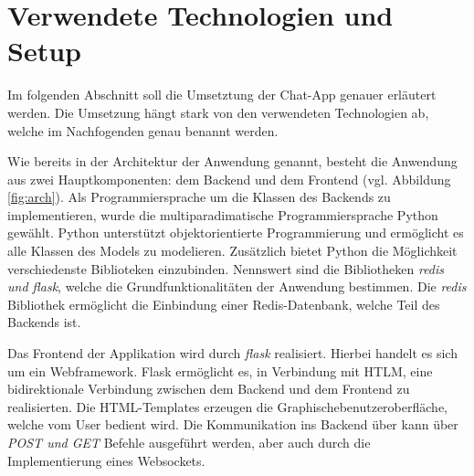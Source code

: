 
\section{Verwendete Technologien und Setup}
Im folgenden Abschnitt soll die Umsetztung der Chat-App genauer erläutert werden.
Die Umsetzung hängt stark von den verwendeten Technologien ab, welche im Nachfogenden genau benannt werden.

Wie bereits in der Architektur der Anwendung genannt, besteht die Anwendung aus zwei Hauptkomponenten: dem Backend und dem Frontend (vgl. Abbildung \ref{fig:arch}).
Als Programmiersprache um die Klassen des Backends zu implementieren, wurde die multiparadimatische Programmiersprache Python gewählt.
Python unterstützt objektorientierte Programmierung und ermöglicht es alle Klassen des Models zu modelieren. 
Zusätzlich bietet Python die Möglichkeit verschiedenste Biblioteken einzubinden.
Nennswert sind die Bibliotheken \textit{redis und flask}, welche die Grundfunktionalitäten der Anwendung bestimmen. 
Die \textit{redis} Bibliothek ermöglicht die Einbindung einer \acs{Redis}-Datenbank, welche Teil des Backends ist.

Das Frontend der Applikation wird durch \textit{flask} realisiert. Hierbei handelt es sich um ein Webframework.
Flask ermöglicht es, in Verbindung mit HTLM, eine bidirektionale Verbindung zwischen dem Backend und dem Frontend zu realisierten.
Die HTML-Templates erzeugen die Graphischebenutzeroberfläche, welche vom User bedient wird. Die Kommunikation ins Backend über kann über \textit{POST und GET} Befehle ausgeführt werden, aber auch durch die Implementierung eines Websockets.

